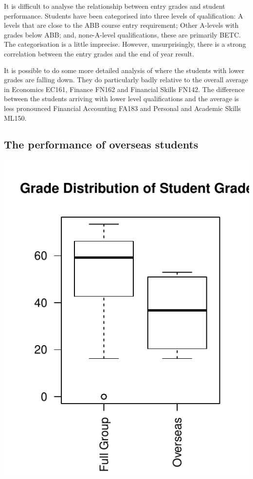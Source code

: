 \documentclass[12pt, a4paper, oneside]{article}\usepackage[]{graphicx}\usepackage[]{color}
\makeatletter
\def\maxwidth{ %
  \ifdim\Gin@nat@width>\linewidth
    \linewidth
  \else
    \Gin@nat@width
  \fi
}
\newenvironment{knitrout}{}{} %
\makeatother
\begin{document}
It is difficult to analyse the relationship between entry grades and student performance.  Students have been categorised into three levels of qualification:  A levels that are close to the ABB course entry requirement; Other A-levels with grades below ABB; and, none-A-level qualifications, these are primarily BETC.  The categorisation is a little imprecise.  However, unsurprisingly, there is a strong correlation between the entry grades and the end of year result.

It is possible to do some more detailed analysis of where the students with lower grades are falling down. They do particularly badly relative to the overall average in Economics EC161, Finance FN162 and Financial Skills FN142.   The difference between the students arriving with lower level qualifications and the average is less pronounced Financial Accounting FA183 and Personal and Academic Skills ML150. 

\subsection*{The performance of overseas students}
\begin{knitrout}
\color{fgcolor}
\includegraphics[width=\maxwidth]{figure/boxplot3} 

\end{knitrout}
\end{document}
